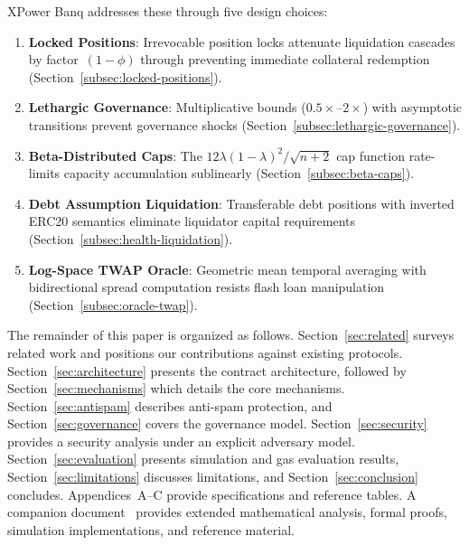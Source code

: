 \documentclass[10pt,a4paper,twocolumn]{article}
\theoremstyle{definition}
\theoremstyle{plain}
\theoremstyle{remark}
\begin{document}
XPower Banq addresses these through five design choices:

\begin{enumerate}[leftmargin=*]
\item \textbf{Locked Positions}: Irrevocable position locks attenuate liquidation cascades by factor~$(1{-}\phi)$ through preventing immediate collateral redemption (Section~\ref{subsec:locked-positions}).

\item \textbf{Lethargic Governance}: Multiplicative bounds ($0.5\times$--$2\times$) with asymptotic transitions prevent governance shocks (Section~\ref{subsec:lethargic-governance}).

\item \textbf{Beta-Distributed Caps}: The \mbox{$12\lambda(1{-}\lambda)^2/\sqrt{n{+}2}$} cap function rate-limits capacity accumulation sublinearly (Section~\ref{subsec:beta-caps}).

\item \textbf{Debt Assumption Liquidation}: Transferable debt positions with inverted ERC20 semantics eliminate liquidator capital requirements (Section~\ref{subsec:health-liquidation}).

\item \textbf{Log-Space TWAP Oracle}: Geometric mean temporal averaging with bidirectional spread computation resists flash loan manipulation (Section~\ref{subsec:oracle-twap}).
\end{enumerate}

The remainder of this paper is organized as follows. Section~\ref{sec:related} surveys related work and positions our contributions against existing protocols. Section~\ref{sec:architecture} presents the contract architecture, followed by Section~\ref{sec:mechanisms} which details the core mechanisms. Section~\ref{sec:antispam} describes anti-spam protection, and Section~\ref{sec:governance} covers the governance model. Section~\ref{sec:security} provides a security analysis under an explicit adversary model. Section~\ref{sec:evaluation} presents simulation and gas evaluation results, Section~\ref{sec:limitations} discusses limitations, and Section~\ref{sec:conclusion} concludes. Appendices~A--C provide specifications and reference tables. A companion document~\cite{apx} provides extended mathematical analysis, formal proofs, simulation implementations, and reference material.

\end{document}
